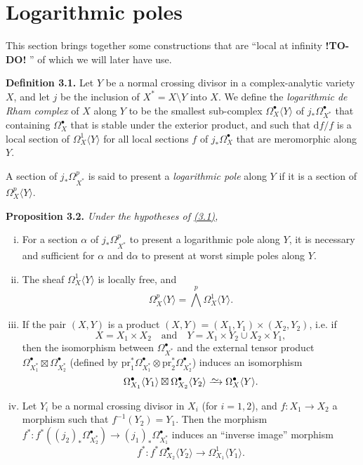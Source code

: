 \documentclass{report}
\newenvironment{itenv}[1]
  {\phantomsection\par\medskip\noindent\textbf{#1.}\itshape}
  {\par\medskip}
\newenvironment{rmenv}[1]
  {\phantomsection\par\medskip\noindent\textbf{#1.}\rmfamily}
  {\par\medskip}
\newcommand{\dd}{\mathrm{d}}
\newcommand{\pr}{\mathrm{pr}}
\newcommand{\simto}{\xrightarrow{\raisebox{-0.7ex}[0ex][0ex]{$\sim$}}}
\newcommand{\todo}{\textbf{ !TO-DO! }}
\newcommand{\oldpage}[1]{\marginpar{\footnotesize$\Big\vert$ \textit{p.~#1}}}
\begin{document}
\section{Logarithmic poles}
\label{II.3}

\oldpage{72}

This section brings together some constructions that are ``local at infinity\todo'' of which we will later have use.

\begin{rmenv}{Definition 3.1}
\label{II.3.1}
  Let $Y$ be a normal crossing divisor in a complex-analytic variety $X$, and let $j$ be the inclusion of $X^*=X\setminus Y$ into $X$.
  We define the \emph{logarithmic de Rham complex} of $X$ along $Y$ to be the smallest sub-complex $\Omega_X^\bullet\langle Y\rangle$ of $j_*\Omega_{X^*}^\bullet$ that containing $\Omega_X^\bullet$ that is stable under the exterior product, and such that $\dd f/f$ is a local section of $\Omega_X^1\langle Y\rangle$ for all local sections $f$ of $j_*\Omega_X^\bullet$ that are meromorphic along $Y$.

  A section of $j_*\Omega_{X^*}^p$ is said to present a \emph{logarithmic pole} along $Y$ if it is a section of $\Omega_X^p\langle Y\rangle$.
\end{rmenv}

\begin{itenv}{Proposition 3.2}
\label{II.3.2}
  Under the hypotheses of \hyperref[II.3.1]{(3.1)},
  \begin{enumerate}[(i)]
    \item For a section $\alpha$ of $j_*\Omega_{X^*}^p$ to present a logarithmic pole along $Y$, it is necessary and sufficient for $\alpha$ and $\dd\alpha$ to present at worst simple poles along $Y$.
    \item The sheaf $\Omega_X^1\langle Y\rangle$ is locally free, and
      \[
        \Omega_X^p\langle Y\rangle = \bigwedge^p \Omega_X^1\langle Y\rangle.
      \]
    \item If the pair $(X,Y)$ is a product $(X,Y)=(X_1,Y_1)\times(X_2,Y_2)$, i.e. if
      \[
        X = X_1\times X_2
        \quad\mbox{and}\quad
        Y = X_1\times Y_2 \cup X_2\times Y_1,
      \]
      then the isomorphism between $\Omega_{X^*}^\bullet$ and the external tensor product $\Omega_{X_1^*}^\bullet\boxtimes\Omega_{X_2^*}^\bullet$ (defined by $\pr_1^*\Omega_{X_1^*}^\bullet\otimes\pr_2^*\Omega_{X_2^*}^\bullet$) induces an isomorphism
      \[
        \Omega_{X_1}^\bullet\langle Y_1\rangle \boxtimes \Omega_{X_2}^\bullet\langle Y_2\rangle
        \simto \Omega_X^\bullet\langle Y\rangle.
      \]
    \item Let $Y_i$ be a normal crossing divisor in $X_i$ (for $i=1,2$), and $f\colon X_1\to X_2$ a morphism such that $f^{-1}(Y_2)=Y_1$.
      Then the morphism $f^*\colon f^*((j_2)_*\Omega_{X_2^*}^\bullet)\to (j_1)_*\Omega_{X_1^*}^\bullet$ induces an ``inverse image'' morphism
      \[
        f^*\colon f^*\Omega_{X_2}^\bullet\langle Y_2\rangle \to \Omega_{X_1}^1\langle Y_1\rangle.
      \]
  \end{enumerate}
\end{itenv}
\end{document}
